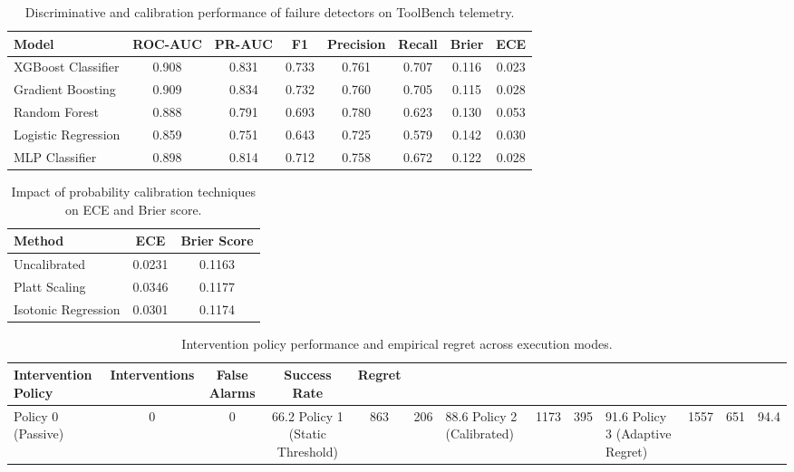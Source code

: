 
\begin{table}[htbp]
\centering
\caption{Discriminative and calibration performance of failure detectors on ToolBench telemetry.}
\label{tab:model_comparison}
\small
\begin{tabular}{lccccccc}
\toprule
\textbf{Model} & \textbf{ROC-AUC} & \textbf{PR-AUC} & \textbf{F1} & \textbf{Precision} & \textbf{Recall} & \textbf{Brier} & \textbf{ECE} \\
\midrule
XGBoost Classifier & 0.908 & 0.831 & 0.733 & 0.761 & 0.707 & 0.116 & 0.023 \\
Gradient Boosting & 0.909 & 0.834 & 0.732 & 0.760 & 0.705 & 0.115 & 0.028 \\
Random Forest & 0.888 & 0.791 & 0.693 & 0.780 & 0.623 & 0.130 & 0.053 \\
Logistic Regression & 0.859 & 0.751 & 0.643 & 0.725 & 0.579 & 0.142 & 0.030 \\
MLP Classifier & 0.898 & 0.814 & 0.712 & 0.758 & 0.672 & 0.122 & 0.028 \\
\bottomrule
\end{tabular}
\end{table}


\begin{table}[htbp]
\centering
\caption{Impact of probability calibration techniques on ECE and Brier score.}
\label{tab:calibration}
\small
\begin{tabular}{lcc}
\toprule
\textbf{Method} & \textbf{ECE} & \textbf{Brier Score} \\
\midrule
Uncalibrated & 0.0231 & 0.1163 \\
Platt Scaling & 0.0346 & 0.1177 \\
Isotonic Regression & 0.0301 & 0.1174 \\
\bottomrule
\end{tabular}
\end{table}


\begin{table}[htbp]
\centering
\caption{Intervention policy performance and empirical regret across execution modes.}
\label{tab:policy_evaluation}
\small
\begin{tabular}{lcccc}
\toprule
\textbf{Intervention Policy} & \textbf{Interventions} & \textbf{False Alarms} & \textbf{Success Rate} & \textbf{Regret} \\
\midrule
Policy 0 (Passive) & 0 & 0 & 66.2%
Policy 1 (Static Threshold) & 863 & 206 & 88.6%
Policy 2 (Calibrated) & 1173 & 395 & 91.6%
Policy 3 (Adaptive Regret) & 1557 & 651 & 94.4%
\bottomrule
\end{tabular}
\end{table}


